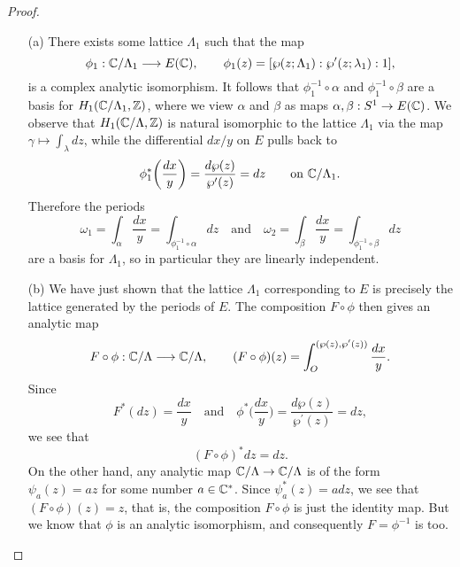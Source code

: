 \begin{proof}
	\begin{enumerate}
		\item[(a)] There exists some lattice $\Lambda_{1}$ such that the map
		\begin{equation*}
			\phi_{1}:\mathbb{C}/\Lambda_{1}\longrightarrow E(\mathbb{C}),\qquad \phi_{1}(z) = [\wp(z;\Lambda_{1}): \wp^{\prime}(z;\lambda_{1}):1],
		\end{equation*}
		is a complex analytic isomorphism. It follows that $\phi_{1}^{-1}\circ\alpha$ and $\phi_{1}^{-1}\circ\beta$ are a basis for $H_{1}(\mathbb{C}/\Lambda_{1},\mathbb{Z})$, where we view $\alpha$ and $\beta$ as maps $\alpha,\beta:S^{1}\rightarrow E(\mathbb{C})$. We observe that $H_{1}(\mathbb{C}/\Lambda,\mathbb{Z})$ is natural isomorphic to the lattice $\Lambda_{1}$ via the map $\gamma\mapsto\int_{\lambda}dz$, while the differential $dx/y$ on $E$ pulls back to
		\begin{equation*}
			\phi_{1}^{\ast}\bigg(\frac{dx}{y}\bigg) = \frac{d\wp(z)}{\wp^{\prime}(z)} = dz\qquad\text{on } \mathbb{C}/\Lambda_{1}.
		\end{equation*}
		Therefore the periods
		\begin{equation*}
			\omega_{1} = \int_{\alpha}\frac{dx}{y} = \int_{\phi_{1}^{-1}\circ\alpha}dz\quad\text{and}\quad \omega_{2} = \int_{\beta}\frac{dx}{y} = \int_{\phi_{1}^{-1}\circ\beta}dz
		\end{equation*}
		are a basis for $\Lambda_{1}$, so in particular they are linearly independent.
		
		\item[(b)] We have just shown that the lattice $\Lambda_{1}$ corresponding to $E$ is precisely the lattice generated by the periods of $E$. The composition $F\circ\phi$ then gives an analytic map
		\begin{equation*}
			F\circ\phi:\mathbb{C}/\Lambda \longrightarrow\mathbb{C}/\Lambda,\qquad (F\circ\phi)(z) = \int_{O}^{(\wp(z), \wp^{\prime}(z))}\frac{dx}{y}.
		\end{equation*}
		Since
		\begin{equation*}
			F^{\ast}(dz) = \frac{dx}{y}\quad\text{and}\quad \phi^{\ast}\bigg(\frac{dx}{y}\bigg) = \frac{d\wp(z)}{\wp^{\prime}(z)} = dz,
		\end{equation*}
		we see that
		\begin{equation*}
			(F\circ \phi)^{\ast}dz = dz.
		\end{equation*}
		On the other hand, any analytic map $\mathbb{C}/\Lambda \rightarrow \mathbb{C}/\Lambda$ is of the form $\psi_{a}(z) = az$ for some number $a \in \mathbb{C}^{\ast}$. Since $\psi_{a}^{\ast}(z) = adz$, we see that $(F\circ \phi)(z) = z$, that is, the composition $F \circ \phi$ is just the identity map. But we know that $\phi$ is an analytic isomorphism, and consequently $F = \phi^{-1}$ is too.
	\end{enumerate}
\end{proof}

